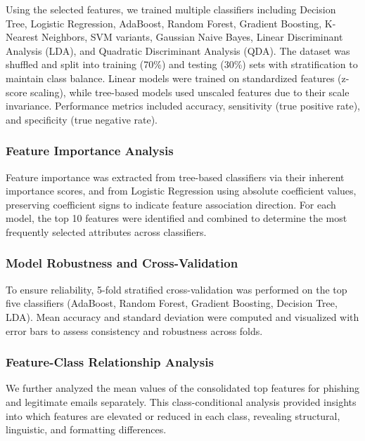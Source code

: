 \documentclass[article,pdftex,10pt,a4paper,twocolumn]{article}
\begin{document}
Using the selected features, we trained multiple classifiers including Decision Tree, Logistic Regression, AdaBoost, Random Forest, Gradient Boosting, K-Nearest Neighbors, SVM variants, Gaussian Naive Bayes, Linear Discriminant Analysis (LDA), and Quadratic Discriminant Analysis (QDA). The dataset was shuffled and split into training (70\%) and testing (30\%) sets with stratification to maintain class balance. Linear models were trained on standardized features (z-score scaling), while tree-based models used unscaled features due to their scale invariance. Performance metrics included accuracy, sensitivity (true positive rate), and specificity (true negative rate).

\subsubsection{Feature Importance Analysis}
\label{methodsfeatureimportanceanalysis}

Feature importance was extracted from tree-based classifiers via their inherent importance scores, and from Logistic Regression using absolute coefficient values, preserving coefficient signs to indicate feature association direction. For each model, the top 10 features were identified and combined to determine the most frequently selected attributes across classifiers.

\subsubsection{Model Robustness and Cross-Validation}
\label{methodsmodelrobustnessandcrossvalidation}

To ensure reliability, 5-fold stratified cross-validation was performed on the top five classifiers (AdaBoost, Random Forest, Gradient Boosting, Decision Tree, LDA). Mean accuracy and standard deviation were computed and visualized with error bars to assess consistency and robustness across folds.

\subsubsection{Feature-Class Relationship Analysis}
\label{modelsfeatureclassrelationshipanalysis}

We further analyzed the mean values of the consolidated top features for phishing and legitimate emails separately. This class-conditional analysis provided insights into which features are elevated or reduced in each class, revealing structural, linguistic, and formatting differences.
\end{document}
